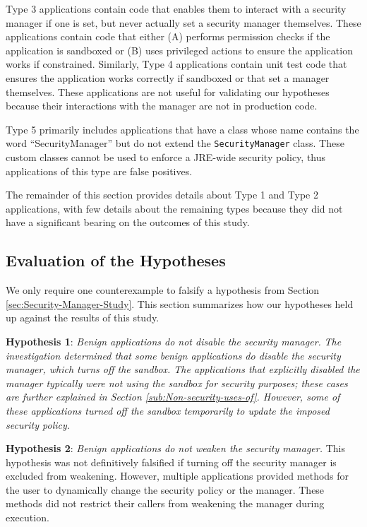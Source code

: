 \documentclass{sig-alternate}
\begin{document}
Type 3 applications contain code that enables them to interact with
a security manager if one is set, but never actually set a security
manager themselves. These applications contain code that either (A)
performs permission checks if the application is sandboxed or (B)
uses privileged actions \cite{_java_privilegedaction} to ensure the
application works if constrained. Similarly, Type 4 applications contain
unit test code that ensures the application works correctly if sandboxed
or that set a manager themselves. These applications are not useful
for validating our hypotheses because their interactions with the
manager are not in production code.

Type 5 primarily includes applications that have a class whose name
contains the word ``SecurityManager'' but do not extend the \texttt{SecurityManager}
class. These custom classes cannot be used to enforce a JRE-wide security
policy, thus applications of this type are false positives. 

The remainder of this section provides details about Type 1 and Type
2 applications, with few details about the remaining types because
they did not have a significant bearing on the outcomes of this study.


\subsection{Evaluation of the Hypotheses}\label{sub:Evaluation-of-the-hypotheses}

We only require one counterexample to falsify a hypothesis from Section
\ref{sec:Security-Manager-Study}. This section summarizes how our
hypotheses held up against the results of this study.

\textbf{Hypothesis 1}: \textit{Benign applications do not disable
the security manager. }\textit{\emph{The investigation determined
that some benign applications do disable the security manager, which
turns off the sandbox. The applications that explicitly disabled the
manager typically were not using the sandbox for security purposes;
these cases are further explained in Section \ref{sub:Non-security-uses-of}.
However, some of these applications turned off the sandbox temporarily
to update the imposed security policy.}}

\textbf{Hypothesis 2}: \emph{Benign applications do not weaken the
security manager. }This hypothesis was not definitively falsified
if turning off the security manager is excluded from weakening. However,
multiple applications provided methods for the user to dynamically
change the security policy or the manager. These methods did not restrict
their callers from weakening the manager during execution.
\end{document}
